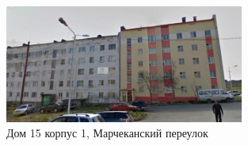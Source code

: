 \begin{figure}[h!]

    \begin{center}
    \includegraphics[width=0.7\textwidth]{authors/sydchak-fig-5.jpg}
  \end{center}
  \caption{Дом 15 корпус 1, Марчеканский переулок}
  \label{fig:sydchak-fig-5}

\end{figure}
